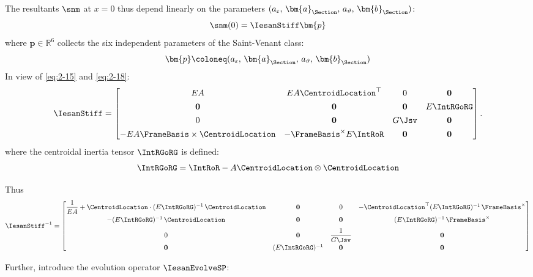 The resultants \(\snm\) at \(x=0\) thus depend linearly on the parameters \((a_{\varepsilon},\, \bm{a}_{\Section},\, a_{\vartheta},\, \bm{b}_{\Section})\):
\begin{equation}
\snm(0) = \IesanStiff\bm{p}
\label{eq:snm0-in-p}
\end{equation}
where \(\bm{p}\in\mathbb{R}^6\) collects the six independent parameters of the Saint-Venant class: 
\begin{equation}
\bm{p} \coloneq (a_{\varepsilon},\, \bm{a}_{\Section},\, a_{\vartheta},\, \bm{b}_{\Section})
\label{eq:def-iesan-vector}
\end{equation}
In view of \eqref{eq:2-15} and \eqref{eq:2-18}:
\begin{equation}
\IesanStiff = \begin{bmatrix}
EA & EA\CentroidLocation^\top & 0 & \mathbf{0} \\[4pt]
\mathbf{0} & \mathbf{0} & \mathbf{0} & E\IntRGoRG \\[4pt]
0 & \mathbf{0} & G\Jsv & \mathbf{0} \\[4pt]
-EA\FrameBasis\times\CentroidLocation & -\FrameBasis^\times E\IntRoR & \mathbf{0} & \mathbf{0}
\end{bmatrix}.
\label{eq:G0-neg-m}
\end{equation}
where the centroidal inertia tensor \(\IntRGoRG\) is defined: 
\begin{equation}
    \IntRGoRG = \IntRoR - A\CentroidLocation\otimes\CentroidLocation
\label{eq:def-intRGoRG}
\end{equation}
\begin{Details}
Thus
\begin{equation}
\IesanStiff^{-1} =
\begin{bmatrix}
\displaystyle \frac{1}{EA} + \CentroidLocation\cdot (E\IntRGoRG)^{-1}\,\CentroidLocation
& \mathbf{0}
& 0
& -\CentroidLocation^\top (E\IntRGoRG)^{-1}\,\FrameBasis^\times
\\[6pt]
-(E\IntRGoRG)^{-1}\,\CentroidLocation
& \mathbf{0}
& \mathbf{0}
& (E\IntRGoRG)^{-1}\,\FrameBasis^\times
\\[6pt]
0
& \mathbf{0}
& \displaystyle \frac{1}{G\Jsv}
& \mathbf{0}
\\[6pt]
\mathbf{0}
& (E\IntRGoRG)^{-1}
& \mathbf{0}
& \mathbf{0}
\end{bmatrix}
\label{eq:G0-inv-neg-m}
\end{equation}
\end{Details}
Further, introduce the evolution operator \(\IesanEvolveSP\):
